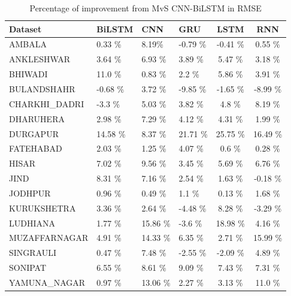 \documentclass[a4paper,fleqn]{cas-sc}
\begin{document}
  \begin{table}[]
    \caption{Percentage of improvement from MvS CNN-BiLSTM in RMSE}
    \label{RMSE imp}
    \begin{tabular}{llllcc}
    \hline    Dataset        &   BiLSTM &   CNN &   GRU &   LSTM &   RNN \\ \hline
    AMBALA         & 0.33 \%           & 8.19\%         & -0.79 \%       & -0.41 \%         & 0.55 \%            \\
    ANKLESHWAR     & 3.64  \%            & 6.93 \%        & 3.89 \%        & 5.47 \%         & 3.18 \%              \\
    BHIWADI       & 11.0  \%            & 0.83 \%         & 2.2 \%         & 5.86  \%        & 3.91 \%            \\
    BULANDSHAHR    & -0.68  \%            & 3.72 \%         & -9.85 \%       & -1.65  \%       & -8.99 \%               \\
    CHARKHI\_DADRI & -3.3 \%            & 5.03 \%        & 3.82 \%        & 4.8   \%        & 8.19   \%              \\
    DHARUHERA      & 2.98 \%            & 7.29 \%        & 4.12 \%        & 4.31 \%         & 1.99     \%             \\
    DURGAPUR       & 14.58 \%          & 8.37 \%         & 21.71 \%       & 25.75  \%       & 16.49  \%                \\
    FATEHABAD    & 2.03 \%           & 1.25 \%        & 4.07 \%        & 0.6    \%       & 0.28  \%                   \\
    HISAR          & 7.02 \%           & 9.56 \%        & 3.45 \%        & 5.69  \%        & 6.76  \%                   \\
    JIND           & 8.31 \%           & 7.16 \%        & 2.54 \%        & 1.63 \%         & -0.18 \%                    \\
    JODHPUR        & 0.96 \%           & 0.49 \%         & 1.1 \%         & 0.13 \%          & 1.68 \%                     \\
    KURUKSHETRA    & 3.36 \%           & 2.64 \%        & -4.48  \%      & 8.28 \%         & -3.29  \%                 \\
    LUDHIANA      & 1.77 \%           & 15.86 \%       & -3.6  \%       & 18.98 \%      & 4.16   \%                  \\
    MUZAFFARNAGAR  & 4.91 \%           & 14.33 \%       & 6.35 \%         & 2.71 \%         & 15.99 \%                    \\
    SINGRAULI      & 0.47 \%           & 7.48 \%        & -2.55 \%       & -2.09 \%        & 4.89  \%                   \\
    SONIPAT        & 6.55 \%           & 8.61 \%        & 9.09 \%        & 7.43 \%         & 7.31  \%                    \\
    YAMUNA\_NAGAR  & 0.97 \%           & 13.06 \%       & 2.27 \%        & 3.13 \%         & 11.0  \%                   \\ \hline
    \end{tabular}
    \end{table}
\end{document}
